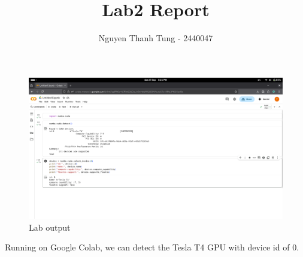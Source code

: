 \documentclass{article}
\title{Lab2 Report}
\author{Nguyen Thanh Tung - 2440047}
\begin{document}
\maketitle

\begin{figure}[h!]
    \centering
    \includegraphics[width=1\linewidth]{ss.png}
    \caption{Lab output}
    \label{fig:placeholder}
\end{figure}

Running on Google Colab, we can detect the Tesla T4 GPU with device id of 0.
\end{document}
